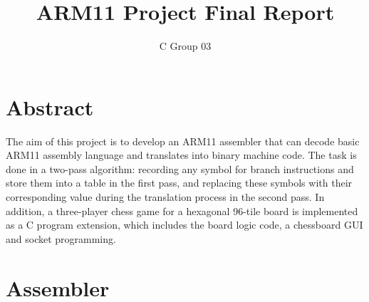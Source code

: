 \documentclass[10pt]{article}
\begin{document}
\title{ARM11 Project Final Report}
\author{C Group 03}

\maketitle

\section{Abstract}
The aim of this project is to develop an ARM11 assembler that can decode basic ARM11 assembly language and translates into binary machine code. The task is done in a two-pass algorithm: recording any symbol for branch instructions and store them into a table in the first pass, and replacing these symbols with their corresponding value during the translation process in the second pass. In addition, a three-player chess game for a hexagonal 96-tile board is implemented as a C program extension, which includes the board logic code, a chessboard GUI and socket programming.
\section{Assembler}
\end{document}
